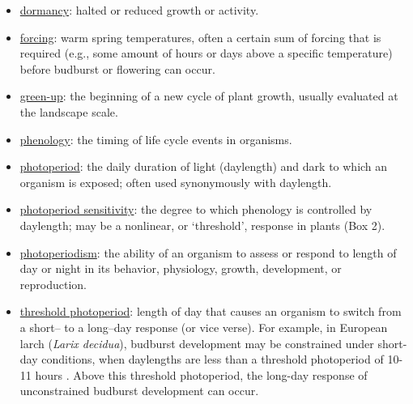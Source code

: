 \documentclass{article}
\begin{document}
\begin{itemize}
\item \underline{dormancy}: halted or reduced growth or activity.
\item \underline{forcing}: warm spring temperatures, often a certain sum of forcing that is required (e.g., some amount of hours or days above a specific temperature) before budburst or flowering can occur.
\item \underline{green-up}: the beginning of a new cycle of plant growth, usually evaluated at the landscape scale.
\item \underline{phenology}: the timing of life cycle events in organisms.
\item \underline{photoperiod}: the daily duration of light (daylength) and dark to which an organism is exposed; often used synonymously with daylength.
\item \underline{photoperiod sensitivity}: the degree to which phenology is controlled by daylength; may be a nonlinear, or `threshold', response in plants (Box 2).
\item \underline{photoperiodism}: the ability of an organism to assess or respond to length of day or night in its behavior, physiology, growth, development, or reproduction.
\item \underline{threshold photoperiod}: length of day that causes an organism to switch from a short-- to a long--day response (or vice verse). For example, in European larch (\emph{Larix decidua}), budburst development may be constrained under short-day conditions, when daylengths are less than a threshold photoperiod of 10-11 hours \citep{migliavacca2008}. Above this threshold photoperiod, the long-day response of unconstrained budburst development can occur.
\end{itemize}
\end{document}

